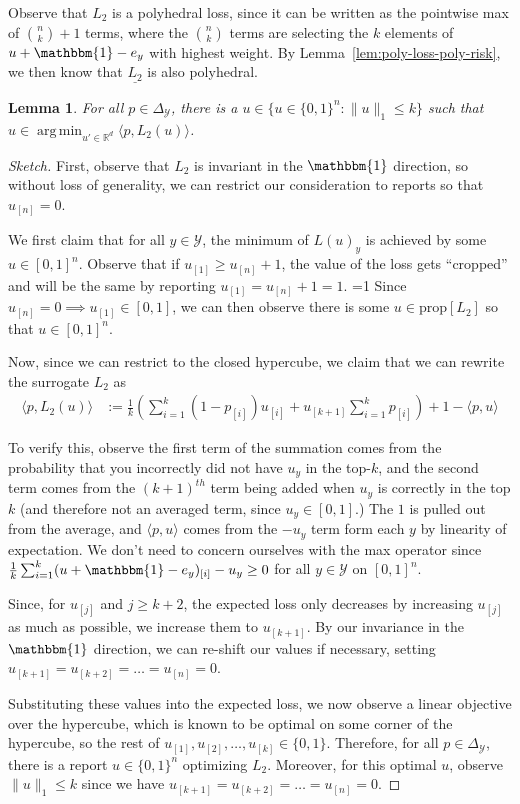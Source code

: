 \documentclass[12pt]{article}
\newcommand{\Comments}{1}
\newcommand{\mytodo}[2]{\ifnum\Comments=1%
  \todo[linecolor=#1!80!black,backgroundcolor=#1,bordercolor=#1!80!black]{#2}\fi}
\newcommand{\jessiet}[1]{\mytodo{purple!20!white}{JF: #1}}
\newcommand{\reals}{\mathbb{R}}
\newcommand{\prop}[1]{\mathrm{prop}[#1]}
\newcommand{\simplex}{\Delta_\Y}
\newcommand{\Y}{\mathcal{Y}}
\newcommand{\risk}[1]{\underline{#1}}
\newcommand{\inprod}[2]{\langle #1, #2 \rangle}%
\newcommand{\ones}{\mathbbm{1}}
\DeclareMathOperator*{\argmin}{arg\,min}
\newtheorem{lemma}{Lemma}
\begin{document}
Observe that $L_2$ is a polyhedral loss, since it can be written as the pointwise max of $\binom{n}{k} +1$ terms, where the $\binom{n}{k}$ terms are selecting the $k$ elements of $u + \ones - e_y$ with highest weight.
By Lemma~\ref{lem:poly-loss-poly-risk}, we then know that $\risk{L_2}$ is also polyhedral.

\begin{lemma}\label{lem:top-k-optimal-corners}
	For all $p \in \simplex$, there is a $u \in \{ u \in \{0,1\}^n : \|u\|_1 \leq k\}$ such that $u \in \argmin_{u' \in \reals^d} \inprod{p}{L_2(u)}$.
\end{lemma}
\begin{proof}[Sketch]
  First, observe that $L_2$ is invariant in the $\ones$ direction, so without loss of generality, we can restrict our consideration to reports so that $u_{[n]} = 0$.
  
  We first claim that for all $y \in \Y$, the minimum of $L(u)_y$ is achieved by some $u \in [0,1]^n$.
  Observe that if $u_{[1]} \geq u_{[n]} + 1$, the value of the loss gets ``cropped'' and will be the same by reporting $u_{[1]} = u_{[n]} + 1 = 1$. \jessiet{Flesh this out later.}
  Since $u_{[n]} = 0 \implies u_{[1]} \in [0,1]$, we can then observe there is some $u \in \prop{L_2}$ so that $u \in [0,1]^n$.
    
  Now, since we can restrict to the closed hypercube, we claim that we can rewrite the surrogate $L_2$ as 
  \begin{align*}
  	\inprod{p}{L_2(u)} &:= \frac{1}{k} \left( \sum_{i=1}^k (1 - p_{[i]}) u_{[i]} + u_{[k+1]} \sum_{i=1}^k p_{[i]} \right) + 1 - \inprod{p}{u}
  \end{align*}
  
  To verify this, observe the first term of the summation comes from the probability that you incorrectly did not have $u_y$ in the top-$k$, and the second term comes from the $(k+1)^{th}$ term being added when $u_y$ is correctly in the top $k$ (and therefore not an averaged term, since $u_y \in [0,1]$.) 
  The $1$ is pulled out from the average, and $\inprod{p}{u}$ comes from the $-u_y$ term form each $y$ by linearity of expectation.
  We don't need to concern ourselves with the max operator since $\frac{1}{k} \sum_{i=1}^k (u + \ones - e_y)_{[i]} - u_y \geq 0$ for all $y \in \Y$ on $[0,1]^n$.
  
  Since, for $u_{[j]}$ and $j \geq k+2$, the expected loss only decreases by increasing $u_{[j]}$ as much as possible, we increase them to $u_{[k+1]}$.
  By our invariance in the $\ones$ direction, we can re-shift our values if necessary, setting $u_{[k+1]} = u_{[k+2]} = \ldots = u_{[n]} = 0$.
  
  Substituting these values into the expected loss, we now observe a linear objective over the hypercube, which is known to be optimal on some corner of the hypercube, so the rest of $u_{[1]}, u_{[2]}, \ldots, u_{[k]} \in \{0,1\}$.
  Therefore, for all $p \in \simplex$, there is a report $u \in \{0,1\}^n$ optimizing $L_2$.
  Moreover, for this optimal $u$, observe $\|u\|_{1} \leq k$ since we have $u_{[k+1]} = u_{[k+2]} = \ldots = u_{[n]} = 0$.
\end{proof}
\end{document}
